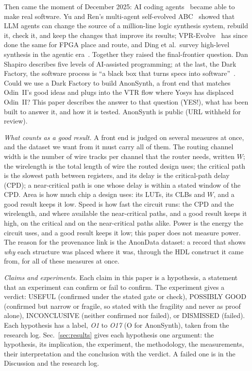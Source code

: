 \documentclass[conference]{IEEEtran}
\begin{document}
Then came the moment of December 2025: AI coding agents~\cite{claudecode} became able to make real software. Yu and Ren's multi-agent self-evolved ABC~\cite{yu2026selfevolvedabc} showed that LLM agents can change the source of a million-line logic synthesis system, rebuild it, check it, and keep the changes that improve its results; VPR-Evolve~\cite{wu2026vprevolve} has since done the same for FPGA place and route, and Ding et al.\ survey high-level synthesis in the agentic era~\cite{ding2026hlsagentic}. Together they raised the final-frontier question. Dan Shapiro describes five levels of AI-assisted programming; at the last, the Dark Factory, the software process is ``a black box that turns specs into software''~\cite{shapiro2026darkfactory}. %
Could we use a Dark Factory to build AnonSynth, a front end that matches Odin~II's good ideas and plugs into the VTR flow where Yosys has displaced Odin~II? This paper describes the answer to that question (YES!), what has been built to answer it, and how it is tested. AnonSynth is public (URL withheld for review).

\emph{What counts as a good result.}
A front end is judged on several measures at once, and the dataset we want from it must carry all of them.
The routing channel width is the number of wire tracks per channel that the router needs, written $W$; %
the wirelength is the total length of wire the routed design uses; %
the critical path is the slowest path between registers, and its delay is the critical-path delay (CPD); %
a near-critical path is one whose delay is within a stated window of the CPD. %
Area is how much chip a design uses: its LUTs, its CLBs and $W$, and a good result keeps it low. %
Speed is how fast the circuit runs: the CPD and the wirelength, and where available the near-critical paths, and a good result keeps it high, on the critical and on the near-critical paths alike. %
Power is the energy the circuit uses, and a good result keeps it low; this paper does not measure power. %
The reason for the provenance link is the AnonData dataset: a record that shows \emph{why} each structure was placed where it was, through the HDL construct it came from, for all of these measures at once.

\emph{Claims and experiments.}
Each claim in this paper is a hypothesis, a statement that an experiment can confirm or fail to confirm. %
The experiment gives a verdict: USEFUL (confirmed under the stated gate or check), POSSIBLY GOOD (confirmed but narrow or fragile, so stated with the fragility and never as proof alone), INCONCLUSIVE (neither confirmed nor failed), or DISMISSED (failed). Each hypothesis has a label, \emph{O1} to \emph{O17} (O for AnonSynth), taken from the research log. Sec.~\ref{sec:results} gives each hypothesis one argument: the hypothesis, its implication, the experiment, the methodology, the measurements, their interpretation and the conclusion with the verdict. A failed one is in the Discussion and the research log.
\end{document}
